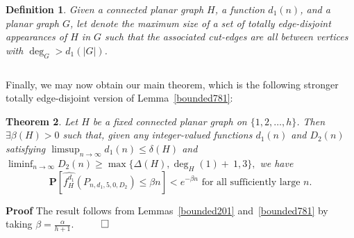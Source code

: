 \documentclass{article}
\newtheorem{Theorem}{Theorem}
\newtheorem{Proof of Theorem}{Proof of Theorem}
\newtheorem{Definition}[Theorem]{Definition}
\begin{document}
\begin{Definition} \label{maxdisjoint}
Given a connected planar graph $H$,
a function $d_{1}(n)$,
and a planar graph $G$,
let \emph{}
denote the maximum size of a set of totally edge-disjoint appearances of $H$ in $G$
such that the associated cut-edges are all between vertices with $\deg_{G}>d_{1}(|G|)$. \\
\end{Definition}
\begin{displaymath}
\end{displaymath} 










Finally, we may now obtain our main theorem,
which is the following stronger totally edge-disjoint version of Lemma~\ref{bounded781}:















\begin{Theorem} \label{bounded11}
Let $H$ be a fixed connected planar graph on $\{ 1,2, \ldots, h \}$.
Then $\exists \beta(H)\!>\!0$ such that,
given any integer-valued functions $d_{1}(n)$ and $D_{2}(n)$ satisfying
$\limsup_{n \to \infty} \!d_{1}(n) \!\leq\! \delta(H)$
and $\liminf_{n \to \infty} \!D_{2}(n) \!\geq\! \max \{ \Delta(H), \deg_{\!H}\!(1)+~\!1, 3 \},$
we have
\begin{displaymath}
\mathbf{P}[\widehat{f_{H}^{d_{1}}}(P_{n,d_{1},5,0,D_{2}}) \leq \beta n] < e^{- \beta n} 
\textrm{ for all sufficiently large } n.
\end{displaymath}
\end{Theorem}
\textbf{Proof}
The result follows from Lemmas~\ref{bounded201} and~\ref{bounded781} by taking 
$\beta = \frac{\alpha}{h+1}$.
$\phantom{www}$
$\setlength{\unitlength}{.25cm}
\begin{picture}(1,1)
\put(0,0){\line(1,0){1}}
\put(0,0){\line(0,1){1}}
\put(1,1){\line(-1,0){1}}
\put(1,1){\line(0,-1){1}}
\end{picture}$ \\
\\
\\
\end{document}

